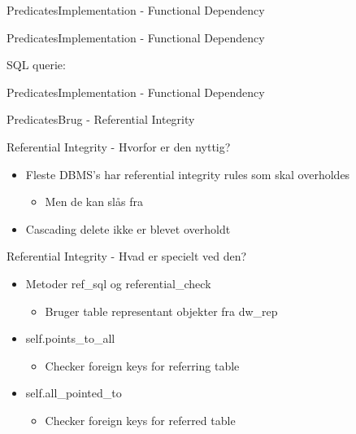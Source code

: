 \begin{frame}{Predicates}{Implementation - Functional Dependency}
\end{frame}

\begin{frame}{Predicates}{Implementation - Functional Dependency}
	\begin{block}{SQL querie:}
	\end{block}
\end{frame}

\begin{frame}{Predicates}{Implementation - Functional Dependency}
\end{frame}

\begin{frame}{Predicates}{Brug - Referential Integrity}
	\begin{block}{Referential Integrity - Hvorfor er den nyttig?}
		\begin{itemize}
			\item<1-> Fleste DBMS's har referential integrity rules som skal overholdes
				\begin{itemize}
					\item<1-> Men de kan slås fra
				\end{itemize}
			\item<2-> Cascading delete ikke er blevet overholdt
		\end{itemize}
	\end{block}
	\pause
	\pause
	\begin{block}{Referential Integrity - Hvad er specielt ved den?}
		\begin{itemize}
			\item<3-> Metoder ref\_sql og referential\_check
				\begin{itemize}
					\item<3-> Bruger table representant objekter fra dw\_rep
				\end{itemize}
			\item<4-> self.points\_to\_all
				\begin{itemize}
					\item<4-> Checker foreign keys for referring table
				\end{itemize}
			\item<4-> self.all\_pointed\_to 
				\begin{itemize}
					\item<4-> Checker foreign keys for referred table
				\end{itemize}
		\end{itemize}
	\end{block}
\end{frame}

